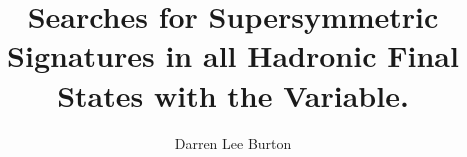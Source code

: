 \documentclass{mythesis}
\title{\LARGE{Searches for Supersymmetric Signatures in all Hadronic Final States with the \alphat Variable.}}
\author{Darren Lee Burton \vspace*{0.5cm}}
\begin{document}



\begin{frontmatter}
  
\end{frontmatter}

\begin{mainmatter}
  \setcounter{page}{16}
  
  
  
  
  
  
  
  
\end{mainmatter}

\begin{appendices}
  
\end{appendices}

\begin{backmatter}
  
\end{backmatter}

\end{document}

